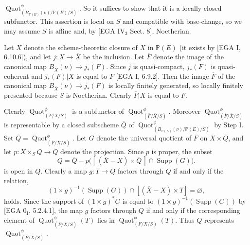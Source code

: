 

\DeclareMathOperator{\Hilb}{Hilb}
\DeclareMathOperator{\Quot}{Quot}
\DeclareMathOperator{\Supp}{Supp}


$\Quot^{\phi}_{(B_{\mathbb P(E)}(\nu)/\mathbb P(E)/S)}$. So it suffices to
show that it is a locally closed subfunctor. This assertion is local on $S$
and compatible with base-change, so we may assume $S$ is affine and, by
[EGA $\mathrm{IV}_3$ Sect. 8], Noetherian.

Let $\overline X$ denote the scheme-theoretic closure of $X$ in
$\mathbb P(E)$ (it exists by [EGA I, 6.10.6]), and let
$j:X\to\overline X$ be the inclusion. Let $\overline F$ denote the image of
the canonical map $B_{\overline X}(\nu)\to j_*(F)$. Since $j$ is
quasi-compact, $j_*(F)$ is quasi-coherent and $j_*(F)|X$ is equal to $F$
[EGA I, 6.9.2]. Then the image $\overline F$ of the canonical map
$B_{\overline X}(\nu)\to j_*(F)$ is locally finitely generated, so locally
finitely presented because $S$ is Noetherian. Clearly $\overline F|X$ is
equal to $F$.

Clearly $\Quot^{\phi}_{(F/X/S)}$ is a subfunctor of
$\Quot^{\phi}_{(\overline F/\overline X/S)}$. Moreover
$\Quot^{\phi}_{(\overline F/\overline X/S)}$ is representable by a closed
subscheme $\overline Q$ of
$\Quot^{\phi}_{(B_{\mathbb P(E)}(\nu)/\mathbb P(E)/S)}$ by Step I. Set
$\overline Q=\Quot^{\phi}_{(\overline F/\overline X/S)}$. Let $G$ denote
the universal quotient of $\overline F$ on $\overline X\times\overline Q$,
and let $p:\overline X\times_S\overline Q\to\overline Q$ denote the
projection. Since $p$ is proper, the subset
\[
Q=\overline Q-p\bigl([\,(\overline X-X)\times\overline Q\,]
  \cap\Supp(G)\bigr).
\]
is open in $\overline Q$.
Clearly a map $g:T\to\overline Q$ factors through $Q$ if and only if the
relation,
\[
(1\times g)^{-1}(\Supp(G))\cap[(\overline X-X)\times T]=\varnothing,
\]
holds. Since the support of $(1\times g)^*G$ is equal to
$(1\times g)^{-1}(\Supp(G))$ by [EGA $0_{\mathrm I}$, 5.2.4.1], the map $g$
factors through $Q$ if and only if the corresponding element of
$\Quot^{\phi}_{(\overline F/\overline X/S)}(T)$ lies in
$\Quot^{\phi}_{(F/X/S)}(T)$. Thus $Q$ represents
$\Quot^{\phi}_{(F/X/S)}$.

